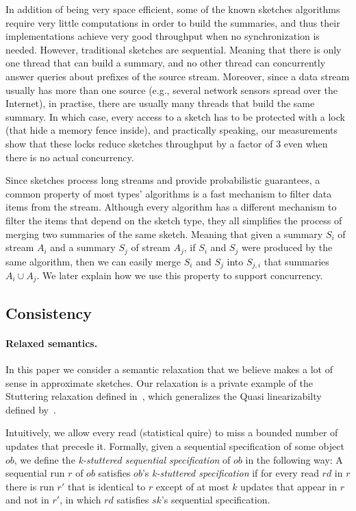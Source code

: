 In addition of being very space efficient, some of the known
sketches algorithms require very little computations in order to
build the summaries, and thus their implementations achieve very
good throughput when no synchronization is needed.
However, traditional sketches are sequential. 
Meaning that there is only one thread that can build a summary,
and no other thread can concurrently answer queries about
prefixes of the source stream.
Moreover, since a data stream usually has more than one source
(e.g., several network sensors spread over the Internet), in
practise, there are usually many threads that build the same
summary.
In which case, every access to a sketch has to be protected with
a lock (that hide a memory fence inside), and practically
speaking, our measurements show that these locks reduce sketches
throughput by a factor of 3 even when there is no actual
concurrency.
 
Since sketches process long streams and provide probabilistic
guarantees, a common property of most types' algorithms is a
fast mechanism to filter data items from the stream.
Although every algorithm has a different mechanism to filter
the items that depend on the sketch type, they all simplifies
the process of merging two summaries of the same sketch. 
Meaning that given a summary $S_i$ of stream $A_i$ and a
summary $S_j$ of stream $A_j$, if $S_i$ and $S_j$ were produced
by the same algorithm, then we can easily merge $S_i$ and $S_j$
into $S_{j,i}$ that summaries $A_i \cup A_j$.
We later explain how we use this property to support
concurrency.

\subsection{Consistency}
\label{sub:relaxed}


\paragraph{Relaxed semantics.}

In this paper we consider a semantic relaxation that we believe
makes a lot of sense in approximate sketches.
Our relaxation is a private example of the Stuttering relaxation
defined in~\cite{Henzinger}, which generalizes the Quasi
linearizabilty defined by~\cite{Afek}.

Intuitively, we allow every read (statistical quire) to miss
a bounded number of updates that precede it.
Formally, given a sequential specification of some object
$ob$, we define the \emph{k-stuttered sequential specification}
of $ob$ in the following way:
A sequential run $r$ of $ob$ satisfies $ob$'s \emph{k-stuttered
specification} if for every read $rd$ in $r$ there is run $r'$
that is identical to $r$ except of at most $k$ updates
that appear in $r$ and not in $r'$, in which $rd$ satisfies
$sk$'s sequential specification.

